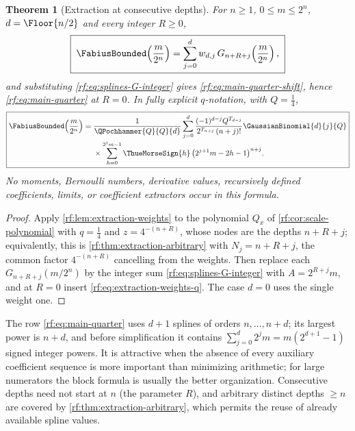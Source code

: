 \documentclass[11pt,oneside]{article}
\theoremstyle{plain}
\newtheorem{theorem}{Theorem}[section]
\theoremstyle{definition}
\theoremstyle{remark}
\newcommand{\Fb}{\FabiusBounded}            %
\newcommand{\tm}[1]{\ThueMorseSign{#1}}     %
\newcommand{\qb}[3]{\GaussianBinomial{#1}{#2}{#3}}
\newcommand{\qp}[3]{\QPochhammer{#1}{#2}{#3}}
\newcommand{\Tr}[1]{T_{#1}}                 %
\begin{document}
\begin{theorem}[Extraction at consecutive depths]
\label{rf:thm:extraction-consecutive}
For $n\ge1$, $0\le m\le2^{n}$, $d=\Floor{n/2}$ and every integer $R\ge0$,
\begin{equation}
 \boxed{\;
 \Fb\!\left(\frac{m}{2^{n}}\right)
 =\sum_{j=0}^{d}w_{d,j}\,G_{n+R+j}\!\left(\frac{m}{2^{n}}\right),\;}
 \label{rf:eq:extraction-consecutive}
\end{equation}
and substituting \cref{rf:eq:splines-G-integer} gives
\cref{rf:eq:main-quarter-shift}, hence \cref{rf:eq:main-quarter} at $R=0$.
In fully explicit $q$-notation, with $Q=\tfrac14$,
\begin{equation}
 \boxed{\begin{aligned}
 \Fb\!\left(\frac{m}{2^{n}}\right)={}&\frac{1}{\qp{Q}{Q}{d}}\sum_{j=0}^{d}
 \frac{(-1)^{d-j}Q^{\Tr{d-j}}}{2^{\Tr{n+j}}\,(n+j)!}\qb{d}{j}{Q}\\[-0.2em]
 &\times\sum_{h=0}^{2^{j}m-1}\tm{h}\,\bigl(2^{j+1}m-2h-1\bigr)^{n+j}.
 \end{aligned}}
 \label{rf:eq:extraction-closed}
\end{equation}
No moments, Bernoulli numbers, derivative values, recursively defined
coefficients, limits, or coefficient extractors occur in this formula.
\end{theorem}

\begin{proof}
Apply \cref{rf:lem:extraction-weights} to the polynomial $Q_{x}$ of
\cref{rf:cor:scale-polynomial} with $q=\tfrac14$ and $z=4^{-(n+R)}$, whose
nodes are the depths $n+R+j$; equivalently, this is
\cref{rf:thm:extraction-arbitrary} with $N_{j}=n+R+j$, the common factor
$4^{-(n+R)}$ cancelling from the weights.  Then replace each
$G_{n+R+j}(m/2^{n})$ by the integer sum \cref{rf:eq:splines-G-integer} with
$A=2^{R+j}m$, and at $R=0$ insert \cref{rf:eq:extraction-weights-q}.  The
case $d=0$ uses the single weight one.
\end{proof}

The row \cref{rf:eq:main-quarter} uses $d+1$ splines of orders
$n,\ldots,n+d$; its largest power is $n+d$, and before simplification it
contains $\sum_{j=0}^{d}2^{j}m=m(2^{d+1}-1)$ signed integer powers.  It is
attractive when the absence of every auxiliary coefficient sequence is more
important than minimizing arithmetic; for large numerators the block
formula is usually the better organization.  Consecutive depths need not
start at $n$ (the parameter $R$), and arbitrary distinct depths $\ge n$ are
covered by \cref{rf:thm:extraction-arbitrary}, which permits the reuse of
already available spline values.
\end{document}

